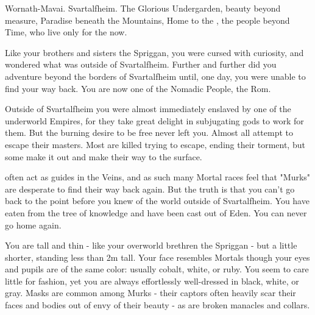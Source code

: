 \begin{multicols*}{2}\raggedcolumns



  Wornath-Mavai. Svartalfheim. The Glorious Undergarden, beauty beyond measure, Paradise beneath the Mountains, Home to the \Murk, the people beyond Time, who live only for the now.

  Like your brothers and sisters the Spriggan, you were cursed with curiosity, and wondered what was outside of Svartalfheim.  Further and further did you adventure beyond the borders of Svartalfheim until, one day, you were unable to find your way back.  You are now one of the Nomadic People, the Rom.

  Outside of Svartalfheim you were almost immediately enslaved by one of the underworld Empires, for they take great delight in subjugating gods to work for them.  But the burning desire to be free never left you. Almost all \Murk attempt to escape their masters.  Most are killed trying to escape, ending their torment, but some make it out and make their way to the surface.  

  \Murk often act as guides in the Veins, and as such many Mortal races feel that "Murks" are desperate to find their way back again. But the truth is that you can't go back to the point before you knew of the world outside of Svartalfheim.  You have eaten from the tree of knowledge and have been cast out of Eden.  You can never go home again.

  You are tall and thin - like your overworld brethren the Spriggan - but a little shorter, standing less than 2m tall.  Your face resembles Mortals though your eyes and pupils are of the same color: usually cobalt, white, or ruby.  You seem to care little for fashion, yet you are always effortlessly well-dressed in black, white, or gray.  Masks are common among Murks - their captors often heavily scar their faces and bodies out of envy of their beauty - as are broken manacles and collars.





\end{multicols*}
